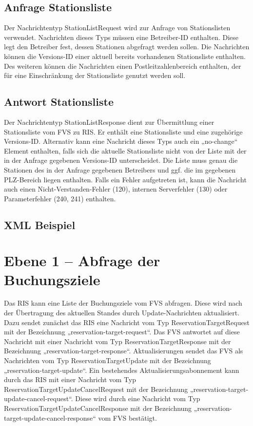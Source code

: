 

\subsection{Anfrage Stationsliste}
Der Nachrichtentyp StationListRequest wird zur Anfrage von Stationslisten verwendet. Nachrichten dieses Typs müssen eine Betreiber-ID enthalten. Diese legt den Betreiber fest, dessen Stationen abgefragt werden sollen. Die Nachrichten können die Versions-ID einer aktuell bereits vorhandenen Stationsliste enthalten. Des weiteren können die Nachrichten einen Postleitzahlenbereich enthalten, der für eine Einschränkung der Stationsliste genutzt werden soll.



\subsection{Antwort Stationsliste}
Der Nachrichtentyp StationListResponse dient zur Übermittlung einer Stationsliste vom FVS zu RIS. Er enthält eine Stationsliste und eine zugehörige Versions-ID. Alternativ kann eine Nachricht dieses Typs auch ein „no-change“ Element enthalten, falls sich die aktuelle Stationsliste nicht von der Liste mit der in der Anfrage gegebenen Versions-ID  unterscheidet. Die Liste muss genau die Stationen des in der Anfrage gegebenen Betreibers und ggf. die im gegebenen PLZ-Bereich liegen enthalten. Falls ein Fehler aufgetreten ist, kann die Nachricht auch einen Nicht-Verstanden-Fehler (120), internen Serverfehler (130) oder Parameterfehler (240, 241) enthalten.



\subsection{XML Beispiel}

\section{Ebene 1 -- Abfrage der Buchungsziele}
Das RIS kann eine Liste der Buchungsziele vom FVS abfragen. Diese wird nach der Übertragung des aktuellen Standes durch Update-Nachrichten aktualisiert. Dazu sendet zunächst das RIS eine Nachricht vom Typ ReservationTargetRequest mit der Bezeichnung „reservation-target-request“. Das FVS antwortet auf diese Nachricht mit einer Nachricht vom Typ ReservationTargetResponse mit der Bezeichnung „reservation-target-response“. Aktualisierungen sendet das FVS als Nachrichten vom Typ ReservationTargetUpdate mit der Bezeichnung „reservation-target-update“. Ein bestehendes Aktualisierungsabonnement kann durch das RIS mit einer Nachricht vom Typ ReservationTargetUpdateCancelRequest mit der Bezeichnung „reservation-target-update-cancel-request“. Diese wird durch eine Nachricht vom Typ ReservationTargetUpdateCancelResponse mit der Bezeichnung „reservation-target-update-cancel-response“ vom FVS bestätigt.

